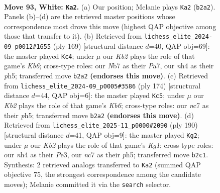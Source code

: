 \documentclass[11pt]{article}
\begin{document}
\clearpage

\begin{figure}[p]\centering
\begin{subfigure}{0.46\textwidth}\centering
\resizebox{\linewidth}{!}{%
\newchessgame
\chessboard[
  setfen={5k2/1Nn5/8/p7/P2pP2n/1PbB4/1K2P2p/8 w - - 2 93},
  showmover=false,
  pgfstyle=straightmove, color=movearrow, markmove={b2-a2}
]}
\caption{}
\end{subfigure}\hfill
\begin{subfigure}{0.46\textwidth}\centering
\resizebox{\linewidth}{!}{%
\newchessgame
\chessboard[
  setfen={8/p1p5/1p5p/1P5P/P4p2/1k2bP2/2B5/1K6 b - - 84 85},
  showmover=false,
  pgfstyle=straightmove, color=movearrow, markmove={b3-c4}
]}
\caption{}
\end{subfigure}
\\[4pt]
\begin{subfigure}{0.46\textwidth}\centering
\resizebox{\linewidth}{!}{%
\newchessgame
\chessboard[
  setfen={8/5k2/pK2p3/Pb2P1Bp/1P5P/8/8/8 w - - 56 88},
  showmover=false,
  pgfstyle=straightmove, color=movearrow, markmove={b6-c5}
]}
\caption{}
\end{subfigure}\hfill
\begin{subfigure}{0.46\textwidth}\centering
\resizebox{\linewidth}{!}{%
\newchessgame
\chessboard[
  setfen={8/8/1B6/P6p/1k2p1p1/3bP1P1/5P2/6K1 w - - 70 96},
  showmover=false,
  pgfstyle=straightmove, color=movearrow, markmove={g1-g2}
]}
\caption{}
\end{subfigure}
\caption{\textbf{Move 93, White: \texttt{Ka2}.} (a) Our position; Melanie plays \texttt{Ka2} (\texttt{b2a2}). Panels (b)--(d) are the retrieved master positions whose correspondence most drove this move (highest QAP objective among those that transfer to it). (b) Retrieved from \texttt{lichess\_elite\_2024-09\_p0012\#1655} (ply 169) [structural distance $d$=40, QAP obj=69]: the master played \texttt{Kc4}; under $\mu$ our \emph{Kb2} plays the role of that game's \emph{Kb6}; cross-type roles: our \emph{N}b7 as their \emph{P}a7, our \emph{n}h4 as their \emph{p}h5; transferred move \texttt{b2a2} \textbf{(endorses this move)}. (c) Retrieved from \texttt{lichess\_elite\_2024-09\_p0005\#3586} (ply 174) [structural distance $d$=44, QAP obj=6]: the master played \texttt{Kc5}; under $\mu$ our \emph{Kb2} plays the role of that game's \emph{Kb6}; cross-type roles: our \emph{n}c7 as their \emph{p}h5; transferred move \texttt{b2a2} \textbf{(endorses this move)}. (d) Retrieved from \texttt{lichess\_elite\_2025-11\_p0000\#2090} (ply 190) [structural distance $d$=41, QAP obj=9]: the master played \texttt{Kg2}; under $\mu$ our \emph{Kb2} plays the role of that game's \emph{Kg1}; cross-type roles: our \emph{n}h4 as their \emph{P}e3, our \emph{n}c7 as their \emph{p}h5; transferred move \texttt{b2c1}. Synthesis: 2 retrieved analogs transferred to \texttt{Ka2} (summed QAP objective 75, the strongest correspondence among the candidate moves); Melanie committed it via the \texttt{search} selector.}
\label{fig:thought-m184}
\end{figure}
\end{document}
